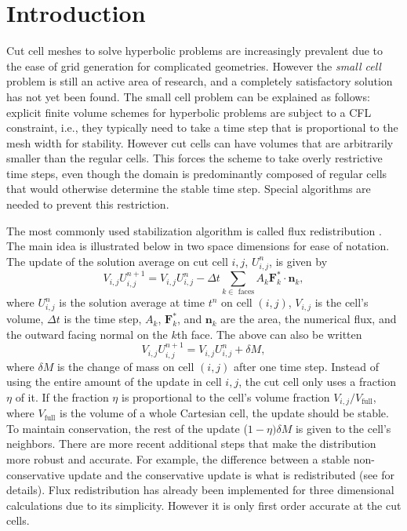 \section{Introduction}\label{sec:intro}
Cut cell meshes to solve hyperbolic problems 
are increasingly prevalent due to the ease 
of grid generation for complicated geometries. 
However the {\em small cell} problem is still an active area of research, and
a completely satisfactory solution has not yet been found.
The small cell problem can be explained as follows: explicit
finite volume schemes for hyperbolic problems are subject to a CFL constraint, i.e.,  they typically need to take a time step that is proportional to the mesh width for
stability. However cut cells can have volumes that are arbitrarily
smaller than the regular cells.  This forces the scheme to take overly restrictive time steps, even though the domain is predominantly composed of regular cells that would otherwise determine the stable time step. Special algorithms are needed to prevent this restriction.

The most commonly used stabilization algorithm is called flux
redistribution \cite{chern:colella,vof:colella}. The main idea is illustrated below in two space
dimensions for ease of notation.
The update of the solution average on cut cell $i,j$, $U^n_{i,j}$, is given by
\begin{equation*}
V_{i,j} U_{i,j} ^{n+1}  = V_{i,j} U_{i,j}^n  -  \Delta t \sum_{k \in \text{ faces}}A_k \mathbf{F}_k^* \cdot \mathbf{n}_k,
\end{equation*}
where $U^n_{i,j}$ is the solution average at time $t^n$ on cell $(i,j)$, $V_{i,j}$ is the cell's volume,  $\Delta t$ is the time step, $A_k$, $\mathbf{F}_k^*$, and $\mathbf{n}_k$ are the area, the numerical flux, and the outward facing normal on the $k$th face.
The above can also be written
\begin{equation*}
V_{i,j} U_{i,j} ^{n+1} = V_{i,j} U_{i,j}^n  +  \delta  M ,
\end{equation*}
where $\delta M$ is the change of mass on cell $(i,j)$ after one time step.
Instead of using the entire amount of the update in cell ${i,j}$, 
the cut cell only uses a fraction $\eta$ of it.  If the fraction $\eta$
is proportional to the cell's volume
fraction $V_{i,j}/V_{\text{full}}$, where $V_{\text{full}}$ is the volume of a whole Cartesian cell, the update should be stable. 
To maintain conservation, the rest of the update ($1-\eta)\delta M$
is given to the cell's neighbors.  
There are more recent additional steps that make the distribution 
more robust and accurate. For example, the difference between a stable
non-conservative update and the conservative update is what is
redistributed (see \cite{vof:colella} for details).
Flux redistribution has already been implemented for three dimensional
calculations due to its simplicity. However it is only first order
accurate at the cut cells.

